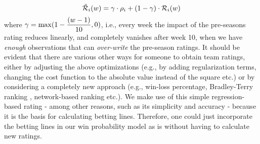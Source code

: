 \documentclass{sig-alternate}
\begin{document}
\begin{equation}
\tilde{\mathcal{R}}_i(w) = \gamma \cdot \rho_i + (1-\gamma)\cdot \mathcal{R}_i(w)
\label{eq:rtg}
\end{equation}
where $\gamma = \max(1-\dfrac{(w-1)}{10},0)$, i.e., every week the impact of  the pre-seasons rating reduces linearly, and completely vanishes after week 10, when we have {\em enough} observations that can {\em over-write} the pre-season ratings.  
It should be evident that there are various other ways for someone to obtain team ratings, either by adjusting the above optimizations (e.g., by adding regularization terms, changing the cost function to the absolute value instead of the square etc.) or by considering a completely new approach (e.g., win-loss percentage, Bradley-Terry ranking \cite{agresti2003categorical}, network-based ranking \cite{pelechrinis2016sportsnetrank} etc.). 
We make use of this simple regression-based rating - among other reasons, such as its simplicity and accuracy - because it is the basis for calculating betting lines.  
Therefore, one could just incorporate the betting lines in our win probability model as is without having to calculate new ratings. 
\end{document}
